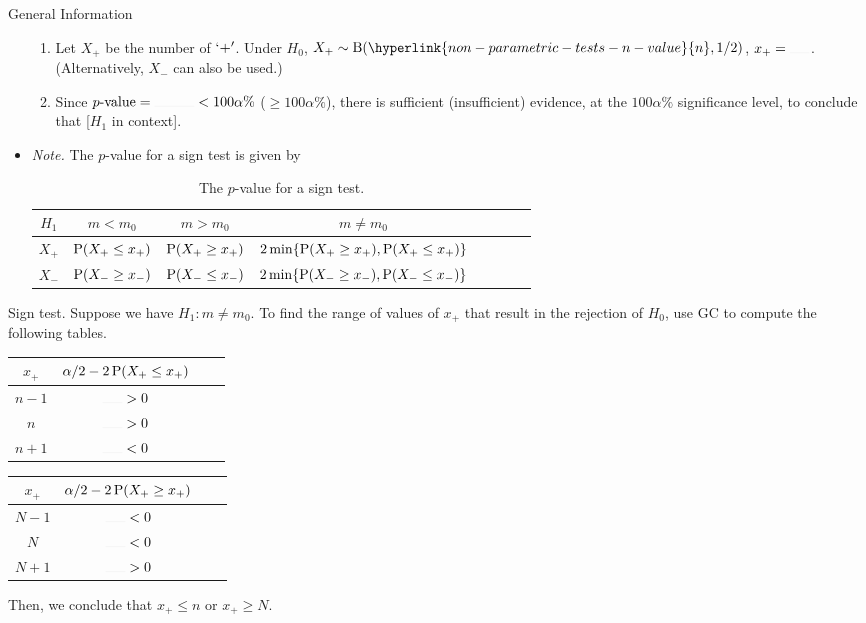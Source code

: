 \begin{stbox}{General Information}
\begin{itemize}
\begin{enumerate}
      \item Let \(X_{+}\) be the number of \(`+'\). Under \(H_0\), \(X_{+}\sim\Binom(\hyperlink{non-parametric-tests-n-value}{n},1/2)\), \(x_{+}=\rule{0.5cm}{0.01mm}\). (Alternatively, \(X_{-}\) can also be used.)
      \item Since \(p\text{-value}=\rule{1cm}{0.01mm}<100\alpha\%\) (\(\geq 100\alpha\%\)), there is sufficient (insufficient) evidence, at the \(100\alpha\%\) significance level, to conclude that [\(H_1\) in context].
    \end{enumerate}
    \item \emph{Note.} The \(p\)-value for a sign test is given by
    \begin{table}[H]
      \centering
      \begin{tabular}{ScScScSc}
        \toprule
        \(H_1\) & \(m<m_0\) & \(m>m_0\) & \(m\neq m_0\)\\
        \midrule
        \(X_{+}\) & \(\operatorname{P}(X_{+}\leq x_{+})\) & \(\operatorname{P}(X_{+}\geq x_{+})\) & \(2\min\{\operatorname{P}(X_{+}\geq x_{+}),\operatorname{P}(X_{+}\leq x_{+})\}\)\\
        \midrule
        \(X_{-}\) & \(\operatorname{P}(X_{-}\geq x_{-})\) & \(\operatorname{P}(X_{-}\leq x_{-})\) & \(2\min\{\operatorname{P}(X_{-}\geq x_{-}),\operatorname{P}(X_{-}\leq x_{-})\}\)\\
        \bottomrule
      \end{tabular}
      \caption{The \(p\)-value for a sign test.}
      \label{table:sign-test-p-value}
    \end{table}
  \end{itemize}
\end{stbox}
\begin{note}
  Sign test. Suppose we have \(H_1\colon m\neq m_0\). To find the range of values of \(x_{+}\) that result in the rejection of \(H_0\), use GC to compute the following tables.
  \begin{table}[H]
    \centering
    \begin{tabular}{|Sc|Sc|}
      \hline
      \(x_{+}\) & \(\alpha/2-2\operatorname{P}(X_{+}\leq x_{+})\)\\
      \hline
      \(n-1\) & \(\rule{0.5cm}{0.01mm}>0\)\\
      \hline
      \(n\) & \(\rule{0.5cm}{0.01mm}>0\)\\
      \hline
      \(n+1\) & \(\rule{0.5cm}{0.01mm}<0\)\\
      \hline
    \end{tabular}\hspace{1cm}
    \begin{tabular}{|Sc|Sc|}
      \hline
      \(x_{+}\) & \(\alpha/2-2\operatorname{P}(X_{+}\geq x_{+})\)\\
      \hline
      \(N-1\) & \(\rule{0.5cm}{0.01mm}<0\)\\
      \hline
      \(N\) & \(\rule{0.5cm}{0.01mm}<0\)\\
      \hline
      \(N+1\) & \(\rule{0.5cm}{0.01mm}>0\)\\
      \hline
    \end{tabular} 
  \end{table}
  Then, we conclude that \(x_{+}\leq n\) or \(x_{+}\geq N\).
\end{note}
